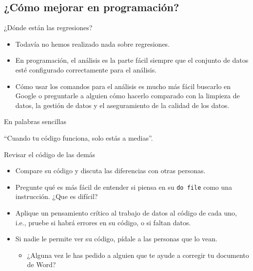 \documentclass[11pt, aspectratio=169, compress]{beamer}
\begin{document}
\subsection{¿Cómo mejorar en programación?}
\begin{frame}{¿Dónde están las regresiones?}
	\begin{itemize}
		\item Todavía no hemos realizado nada sobre regresiones. 
		\item En programación, el análisis es la parte fácil siempre que el conjunto de datos esté configurado correctamente para el análisis.
		\item Cómo usar los comandos para el análisis es mucho más fácil buscarlo en Google o preguntarle a alguien cómo hacerlo comparado con  la limpieza de datos, la gestión de datos y el aseguramiento de la calidad de los datos.
	\end{itemize}
\end{frame}
\begin{frame}{En palabras sencillas}
	\begin{center}
		``Cuando tu código funciona, solo estás a medias''. 
	\end{center}
\end{frame}
\begin{frame}{Revisar el código de las demás}
	\begin{itemize}
		\item Compare su código y discuta las diferencias con otras personas.
		\item Pregunte qué es más fácil de entender si piensa en su \texttt{do file} como una instrucción. ¿Que es difícil?
		\item Aplique un pensamiento crítico al trabajo de datos al código de cada uno, i.e., pruebe si habrá errores en su código, o si faltan datos.
		\item Si nadie le permite ver su código, pídale a las personas que lo vean. 
		\begin{itemize}
			\item ¿Alguna vez le has pedido a alguien que te ayude a corregir tu documento de Word?
		\end{itemize}
	\end{itemize}
\end{frame}
\end{document}
